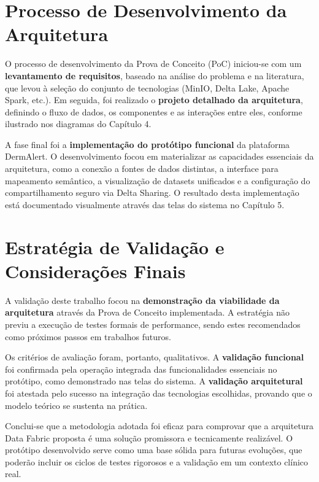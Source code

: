 \section{Processo de Desenvolvimento da Arquitetura}

O processo de desenvolvimento da Prova de Conceito (PoC) iniciou-se com um \textbf{levantamento de requisitos}, baseado na análise do problema e na literatura, que levou à seleção do conjunto de tecnologias (MinIO, Delta Lake, Apache Spark, etc.). Em seguida, foi realizado o \textbf{projeto detalhado da arquitetura}, definindo o fluxo de dados, os componentes e as interações entre eles, conforme ilustrado nos diagramas do Capítulo 4.

A fase final foi a \textbf{implementação do protótipo funcional} da plataforma DermAlert. O desenvolvimento focou em materializar as capacidades essenciais da arquitetura, como a conexão a fontes de dados distintas, a interface para mapeamento semântico, a visualização de datasets unificados e a configuração do compartilhamento seguro via Delta Sharing. O resultado desta implementação está documentado visualmente através das telas do sistema no Capítulo 5.

\section{Estratégia de Validação e Considerações Finais}

A validação deste trabalho focou na \textbf{demonstração da viabilidade da arquitetura} através da Prova de Conceito implementada. A estratégia não previu a execução de testes formais de performance, sendo estes recomendados como próximos passos em trabalhos futuros.

Os critérios de avaliação foram, portanto, qualitativos. A \textbf{validação funcional} foi confirmada pela operação integrada das funcionalidades essenciais no protótipo, como demonstrado nas telas do sistema. A \textbf{validação arquitetural} foi atestada pelo sucesso na integração das tecnologias escolhidas, provando que o modelo teórico se sustenta na prática.

Conclui-se que a metodologia adotada foi eficaz para comprovar que a arquitetura Data Fabric proposta é uma solução promissora e tecnicamente realizável. O protótipo desenvolvido serve como uma base sólida para futuras evoluções, que poderão incluir os ciclos de testes rigorosos e a validação em um contexto clínico real.
